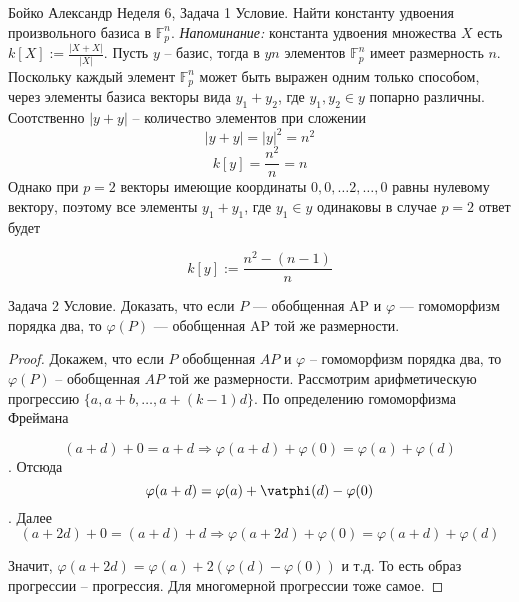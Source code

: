 \documentclass[a4paper,12pt]{article}
\numberwithin{equation}{section}
\theoremstyle{plain}
\theoremstyle{definition}
\theoremstyle{remark}
\def\F{\mathbb {F}}
\begin{document}

Бойко Александр
\newline
\newline
Неделя 6, Задача 1 \newline
Условие. Найти константу удвоения произвольного базиса в $\F_p^n$. \textit{Напоминание:}  константа удвоения множества $X$ есть $k[X] := \frac{|X + X|}{|X|}$. \newline
Пусть $y$ -- базис, тогда в $y n$ элементов $\F_p^n$ имеет размерность $n$. \newline
Поскольку каждый элемент $\F_p^n$ может быть выражен одним только способом, через элементы базиса \Rightarrow векторы вида $y_1 + y_2$, где  $y_1, y_2 \in y$ попарно различны. Соотственно $|y+y|$ -- количество элементов при сложении $$|y+y| = |y|^2 = n^2$$
$$k[y] = \frac{n^2}{n} = n$$
Однако при $p=2$ векторы имеющие координаты $0,0, \ldots 2, \ldots, 0$ равны нулевому вектору, поэтому все элементы $y_1+y_1$, где $y_1 \in y$ одинаковы \Rightarrow в случае $p=2$ ответ будет 

$$k[y] := \frac{n^2-(n-1)}{n}$$ \newline
\newline

Задача 2 \newline
Условие. Доказать, что если $P$ --- обобщенная AP и $\varphi$ --- гомоморфизм порядка два, то $\varphi (P)$ --- обобщенная AP той же размерности.
\begin{proof}
Докажем, что если $P$ обобщенная $AP$ и $\varphi$ -- гомоморфизм порядка два, то $\varphi(P)$ -- обобщенная $AP$ той же размерности. \newline
Рассмотрим арифметическую прогрессию $\{a, a+b, \ldots, a + (k-1)d\}$. По определению гомоморфизма Фреймана

$$(a+d) + 0 = a + d \Rightarrow \varphi(a+d) + \varphi(0) = \varphi(a) + \varphi(d)$$.
Отсюда 
$$\varphi(a+d)=\varphi(a) + \vatphi(d) - \varphi(0)$$.
Далее
$$(a+2d) + 0 = (a+d)+d \Rightarrow \varphi(a+2d) + \varphi(0) = \varphi(a+d) + \varphi(d)$$

Значит, $\varphi(a+2d) = \varphi(a) + 2(\varphi(d) - \varphi(0))$ и т.д. То есть образ прогрессии -- прогрессия. Для многомерной прогрессии тоже самое.

\end{proof}
\end{document}
